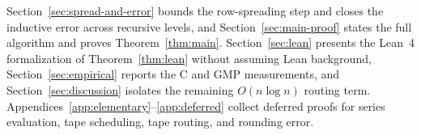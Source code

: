 Section~\ref{sec:spread-and-error} bounds the row-spreading step and closes the inductive error across recursive levels, and Section~\ref{sec:main-proof} states the full algorithm and proves Theorem~\ref{thm:main}. Section~\ref{sec:lean} presents the Lean~4 formalization of Theorem~\ref{thm:lean} without assuming Lean background, Section~\ref{sec:empirical} reports the C and GMP measurements, and Section~\ref{sec:discussion} isolates the remaining $O(n \log n)$ routing term. Appendices~\ref{app:elementary}--\ref{app:deferred} collect deferred proofs for series evaluation, tape scheduling, tape routing, and rounding error.
